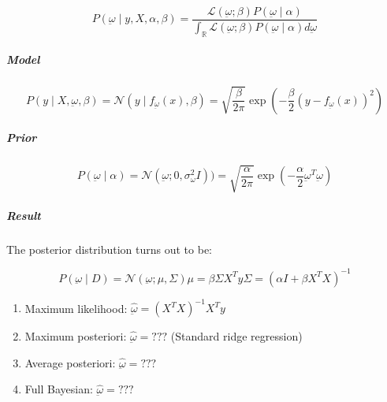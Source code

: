 \[P(\underbar{\omega} \mid y, X, \alpha, \beta) = \frac{\mathcal{L}(\underbar{\omega}; \beta) P(\underbar{\omega} \mid \alpha)}
	{\int_{\mathds{R}} \mathcal{L}(\underbar{\omega}; \beta) P(\underbar{\omega} \mid \alpha) d\underbar{\omega}}
\]

\begin{recap}{}{}

\subparagraph{Model}

\[
	P(y \mid  X, \underbar{\omega}, \beta) = \mathcal{N}(y \mid f_{\underbar{\omega}}(x), \beta) =
	\sqrt{\frac{\beta}{2\pi}} \exp \left( -\frac{\beta}{2} (y - f_{\underbar{\omega}}(x))^2 \right)
\]

\subparagraph{Prior}

\[P(\underbar{\omega} \mid \alpha) = \mathcal{N}(\underbar{\omega} ; 0 , \sigma_{\omega}^2 I)) =
	\sqrt{\frac{\alpha}{2\pi}} \exp \left( -\frac{\alpha}{2} \underbar{\omega}^T \underbar{\omega} \right)
\]

\subparagraph{Result}

The posterior distribution turns out to be:

\[P(\underbar{\omega} \mid D) = \mathcal{N}(\underbar{\omega} ; \mu, \Sigma)
	\mu = \beta \Sigma X^T y
	\Sigma = \left( \alpha I + \beta X^T X \right)^{-1}
\]

\begin{enumerate}
	\item
	      Maximum likelihood: \(\hat{\underbar{\omega}} = (X^T X)^{-1} X^T y\)
	\item
	      Maximum posteriori: \(\hat{\underbar{\omega}} = ???\) (Standard ridge
	      regression)
	\item
	      Average posteriori: \(\hat{\underbar{\omega}} = ???\)
	\item
	      Full Bayesian: \(\hat{\underbar{\omega}} = ???\)
\end{enumerate}

\end{recap}
